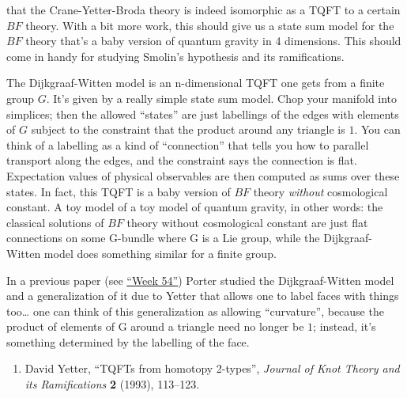 \documentclass{article}
\def\tightlist{}
\renewcommand{\texttt}[1]{%
  \begingroup
  \ttfamily
  \begingroup\lccode`~=`/\lowercase{\endgroup\def~}{/\discretionary{}{}{}}%
  \begingroup\lccode`~=`[\lowercase{\endgroup\def~}{[\discretionary{}{}{}}%
  \begingroup\lccode`~=`.\lowercase{\endgroup\def~}{.\discretionary{}{}{}}%
  \catcode`/=\active\catcode`[=\active\catcode`.=\active
  \scantokens{#1\noexpand}%
  \endgroup
}
\begin{document}
that the Crane-Yetter-Broda theory is indeed isomorphic as a TQFT to a
certain \(BF\) theory. With a bit more work, this should give us a state
sum model for the \(BF\) theory that's a baby version of quantum gravity
in 4 dimensions. This should come in handy for studying Smolin's
hypothesis and its ramifications.


The Dijkgraaf-Witten model is an n-dimensional TQFT one gets from a
finite group \(G\). It's given by a really simple state sum model. Chop
your manifold into simplices; then the allowed ``states'' are just
labellings of the edges with elements of \(G\) subject to the constraint
that the product around any triangle is \(1\). You can think of a
labelling as a kind of ``connection'' that tells you how to parallel
transport along the edges, and the constraint says the connection is
flat. Expectation values of physical observables are then computed as
sums over these states. In fact, this TQFT is a baby version of \(BF\)
theory \emph{without} cosmological constant. A toy model of a toy model
of quantum gravity, in other words: the classical solutions of \(BF\)
theory without cosmological constant are just flat connections on some
G-bundle where G is a Lie group, while the Dijkgraaf-Witten model does
something similar for a finite group.

In a previous paper (see \protect\hyperlink{week54}{``Week 54''}) Porter
studied the Dijkgraaf-Witten model and a generalization of it due to
Yetter that allows one to label faces with things too\ldots{} one can
think of this generalization as allowing ``curvature'', because the
product of elements of G around a triangle need no longer be \(1\);
instead, it's something determined by the labelling of the face.

\begin{enumerate}
\def\labelenumi{\arabic{enumi})}
\setcounter{enumi}{6}
\tightlist
\item
  David Yetter, ``TQFTs from homotopy 2-types'', \emph{Journal of Knot
  Theory and its Ramifications} \textbf{2} (1993), 113--123.
\end{enumerate}
\end{document}
